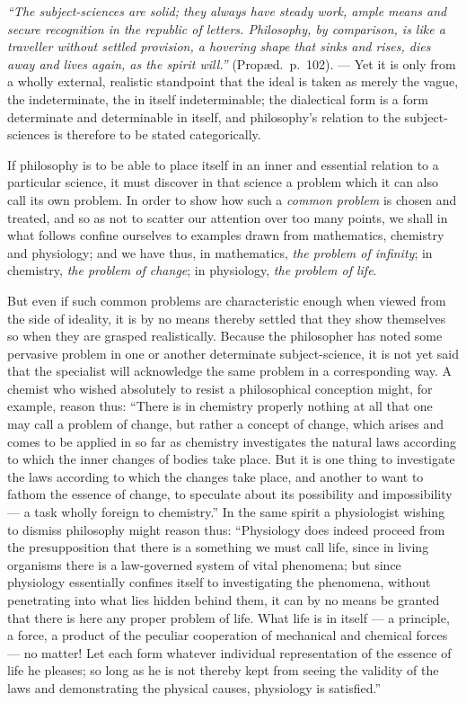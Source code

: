 \documentclass[12pt,a4paper]{book}
\begin{document}
\emph{``The subject-sciences are solid; they always have steady work, ample
means and secure recognition in the republic of letters. Philosophy, by
comparison, is like a traveller without settled provision, a hovering shape
that sinks and rises, dies away and lives again, as the spirit will.''}
(Propæd.\ p.~102). --- Yet it is only from a wholly external, realistic
standpoint that the ideal is taken as merely the vague, the indeterminate, the
in itself indeterminable; the dialectical form is a form determinate and
determinable in itself, and philosophy's relation to the subject-sciences is
therefore to be stated categorically.

If philosophy is to be able to place itself in an inner and essential relation
to a particular science, it must discover in that science a problem which it
can also call its own problem. In order to show how such a \emph{common
problem} is chosen and treated, and so as not to scatter our attention over too
many points, we shall in what follows confine ourselves to examples drawn from
mathematics, chemistry and physiology; and we have thus, in mathematics,
\emph{the problem of infinity}; in chemistry, \emph{the problem of change}; in
physiology, \emph{the problem of life}.

But even if such common problems are characteristic enough when viewed from the
side of ideality, it is by no means thereby settled that they show themselves
so when they are grasped realistically. Because the philosopher has noted some
pervasive problem in one or another determinate subject-science, it is not yet
said that the specialist will acknowledge the same problem in a corresponding
way. A chemist who wished absolutely to resist a philosophical conception
might, for example, reason thus: ``There is in chemistry properly nothing at
all that one may call a problem of change, but rather a concept of change,
which arises and comes to be applied in so far as
chemistry investigates the natural laws according to which the inner changes of
bodies take place. But it is one thing to investigate the laws according to
which the changes take place, and another to want to fathom the essence of
change, to speculate about its possibility and impossibility --- a task wholly
foreign to chemistry.'' In the same spirit a physiologist wishing to dismiss
philosophy might reason thus: ``Physiology does indeed proceed from the
presupposition that there is a something we must call life, since in living
organisms there is a law-governed system of vital phenomena; but since
physiology essentially confines itself to investigating the phenomena, without
penetrating into what lies hidden behind them, it can by no means be granted
that there is here any proper problem of life. What life is in itself --- a
principle, a force, a product of the peculiar cooperation of mechanical and
chemical forces --- no matter! Let each form whatever individual representation
of the essence of life he pleases; so long as he is not thereby kept from
seeing the validity of the laws and demonstrating the physical causes,
physiology is satisfied.''
\end{document}
